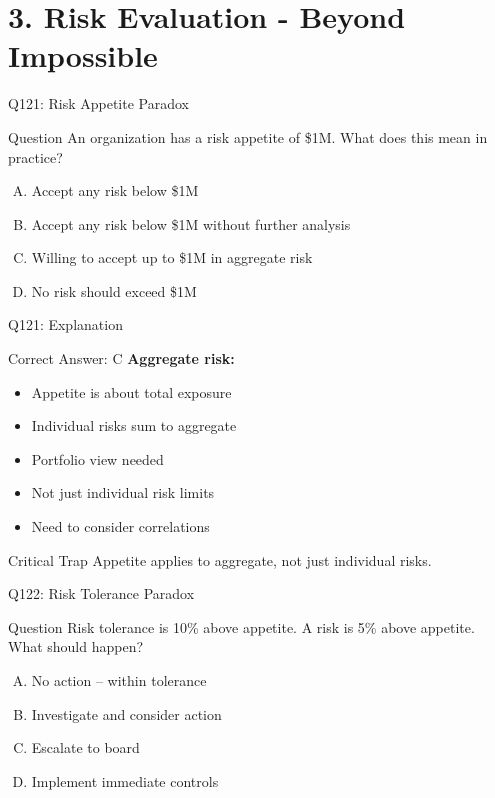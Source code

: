 \documentclass{beamer}
\begin{document}
	\section{3. Risk Evaluation - Beyond Impossible}
	
	\begin{frame}{Q121: Risk Appetite Paradox}
		\begin{block}{Question}
			An organization has a risk appetite of \$1M. What does this mean in practice?
		\end{block}
		\begin{enumerate}[(A)]
			\item Accept any risk below \$1M
			\item Accept any risk below \$1M without further analysis
			\item Willing to accept up to \$1M in aggregate risk
			\item No risk should exceed \$1M
		\end{enumerate}
	\end{frame}
	
	\begin{frame}{Q121: Explanation}
		\begin{block}{Correct Answer: C}
			\textbf{Aggregate risk:}
			\begin{itemize}
				\item Appetite is about total exposure
				\item Individual risks sum to aggregate
				\item Portfolio view needed
				\item Not just individual risk limits
				\item Need to consider correlations
			\end{itemize}
		\end{block}
		\begin{alertblock}{Critical Trap}
			Appetite applies to aggregate, not just individual risks.
		\end{alertblock}
	\end{frame}
	
	\begin{frame}{Q122: Risk Tolerance Paradox}
		\begin{block}{Question}
			Risk tolerance is 10\% above appetite. A risk is 5\% above appetite. What should happen?
		\end{block}
		\begin{enumerate}[(A)]
			\item No action -- within tolerance
			\item Investigate and consider action
			\item Escalate to board
			\item Implement immediate controls
		\end{enumerate}
	\end{frame}
	
\end{document}

